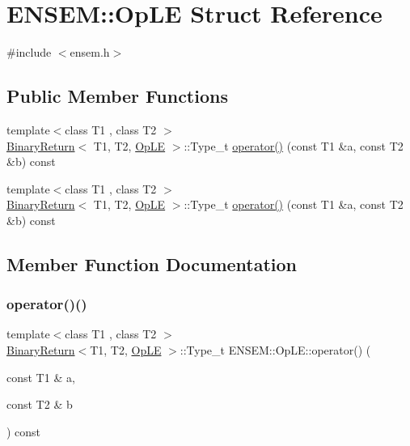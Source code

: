 \hypertarget{structENSEM_1_1OpLE}{}\section{E\+N\+S\+EM\+:\+:Op\+LE Struct Reference}
\label{structENSEM_1_1OpLE}


{\ttfamily \#include $<$ensem.\+h$>$}

\subsection*{Public Member Functions}
\begin{DoxyCompactItemize}
\item 
{\footnotesize template$<$class T1 , class T2 $>$ }\\\mbox{\hyperlink{structENSEM_1_1BinaryReturn}{Binary\+Return}}$<$ T1, T2, \mbox{\hyperlink{structENSEM_1_1OpLE}{Op\+LE}} $>$\+::Type\+\_\+t \mbox{\hyperlink{structENSEM_1_1OpLE_aecbfd8b265536bef6bc1dc2a124858ae}{operator()}} (const T1 \&a, const T2 \&b) const
\item 
{\footnotesize template$<$class T1 , class T2 $>$ }\\\mbox{\hyperlink{structENSEM_1_1BinaryReturn}{Binary\+Return}}$<$ T1, T2, \mbox{\hyperlink{structENSEM_1_1OpLE}{Op\+LE}} $>$\+::Type\+\_\+t \mbox{\hyperlink{structENSEM_1_1OpLE_aecbfd8b265536bef6bc1dc2a124858ae}{operator()}} (const T1 \&a, const T2 \&b) const
\end{DoxyCompactItemize}


\subsection{Member Function Documentation}
\mbox{\label{structENSEM_1_1OpLE_aecbfd8b265536bef6bc1dc2a124858ae}} 
\subsubsection{\texorpdfstring{operator()()}{operator()()}\hspace{0.1cm}{\footnotesize\ttfamily [1/2]}}
{\footnotesize\ttfamily template$<$class T1 , class T2 $>$ \\
\mbox{\hyperlink{structENSEM_1_1BinaryReturn}{Binary\+Return}}$<$T1, T2, \mbox{\hyperlink{structENSEM_1_1OpLE}{Op\+LE}} $>$\+::Type\+\_\+t E\+N\+S\+E\+M\+::\+Op\+L\+E\+::operator() (\begin{DoxyParamCaption}\item[{const T1 \&}]{a,  }\item[{const T2 \&}]{b }\end{DoxyParamCaption}) const\hspace{0.3cm}{\ttfamily [inline]}}


